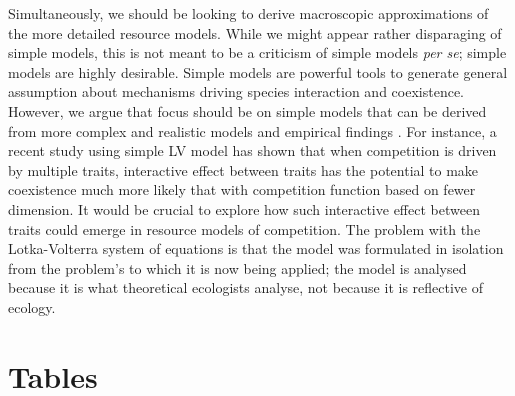 \documentclass[a4paper,11pt]{article}
\begin{document}
Simultaneously, we should be looking to derive macroscopic approximations of the more detailed resource models.
While we might appear rather disparaging of simple models, this is not meant to be a criticism of simple models \textit{per se}; simple models are highly desirable.
Simple models are powerful tools to generate general assumption about mechanisms driving species interaction and coexistence. However, we argue that focus should be on simple models that can be derived from more complex and realistic models and empirical findings \citep[e.g.][]{Champagnat-2006}. For instance, a recent study \citep{Doebeli-2010} using simple LV model has shown that when competition is driven by multiple traits, interactive effect between traits has the potential to make coexistence much more likely that with competition function based on fewer dimension. It would be crucial to explore how such interactive effect between traits could emerge in resource models of competition.
The problem with the Lotka-Volterra system of equations is that the model was formulated in isolation from the problem's to which it is now being applied; the model is analysed because it is what theoretical ecologists analyse, not because it is reflective of ecology.


\clearpage

\section{Tables}
\end{document}
